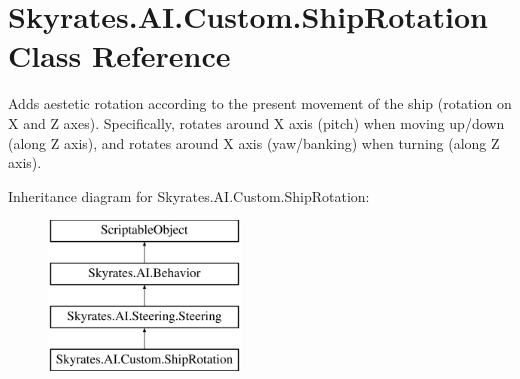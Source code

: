 \hypertarget{class_skyrates_1_1_a_i_1_1_custom_1_1_ship_rotation}{\section{Skyrates.\-A\-I.\-Custom.\-Ship\-Rotation Class Reference}
\label{class_skyrates_1_1_a_i_1_1_custom_1_1_ship_rotation}
}


Adds aestetic rotation according to the present movement of the ship (rotation on X and Z axes). Specifically, rotates around X axis (pitch) when moving up/down (along Z axis), and rotates around X axis (yaw/banking) when turning (along Z axis).  


Inheritance diagram for Skyrates.\-A\-I.\-Custom.\-Ship\-Rotation\-:\begin{figure}[H]
\begin{center}
\leavevmode
\includegraphics[height=4.000000cm]{class_skyrates_1_1_a_i_1_1_custom_1_1_ship_rotation}
\end{center}
\end{figure}
